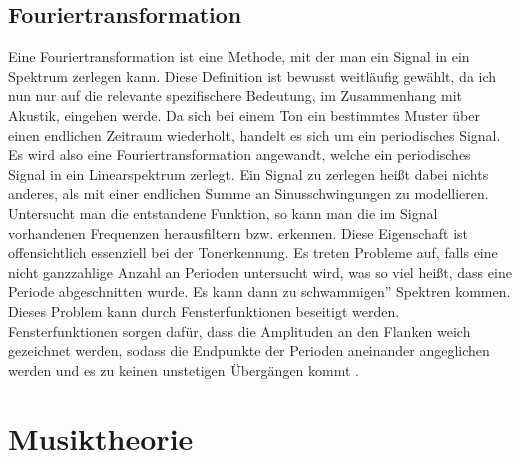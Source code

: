 \subsection*{Fouriertransformation}
\label{sec:Fouriertransformation}
Eine Fouriertransformation ist eine Methode, mit der man ein Signal in ein Spektrum zerlegen kann. Diese Definition ist bewusst weitläufig gewählt, da ich nun nur auf die relevante spezifischere Bedeutung, im Zusammenhang mit Akustik, eingehen werde.
Da sich bei einem Ton ein bestimmtes Muster über einen endlichen Zeitraum wiederholt, handelt es sich um ein periodisches Signal. Es wird also eine Fouriertransformation angewandt, welche ein
periodisches Signal in ein Linearspektrum zerlegt. Ein Signal zu zerlegen heißt dabei nichts anderes, als mit einer endlichen Summe an Sinusschwingungen zu modellieren. Untersucht man die entstandene Funktion, so kann man die im Signal vorhandenen Frequenzen 
herausfiltern bzw. erkennen. Diese Eigenschaft ist offensichtlich essenziell bei der Tonerkennung. Es treten Probleme auf, falls eine nicht ganzzahlige Anzahl an Perioden untersucht wird, was so viel heißt, dass eine Periode abgeschnitten wurde. Es kann dann zu \glqq schwammigen'' Spektren kommen.
Dieses Problem kann durch Fensterfunktionen beseitigt werden. Fensterfunktionen sorgen dafür, dass die Amplituden an den Flanken weich gezeichnet werden, sodass die Endpunkte der Perioden aneinander angeglichen werden und es zu keinen unstetigen Übergängen kommt \cite{Butz2006}.

\section{Musiktheorie}
